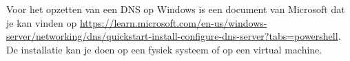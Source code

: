Voor het opzetten van een DNS op Windows is een document van Microsoft dat je kan vinden op \url{https://learn.microsoft.com/en-us/windows-server/networking/dns/quickstart-install-configure-dns-server?tabs=powershell}. De installatie kan je doen op een fysiek systeem of op een virtual machine.

